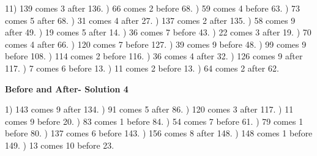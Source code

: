 \documentclass{article}%
\begin{document}
11) 139 comes 3 after 136.%
) 66 comes 2 before 68.%
) 59 comes 4 before 63.%
) 73 comes 5 after 68.%
) 31 comes 4 after 27.%
) 137 comes 2 after 135.%
) 58 comes 9 after 49.%
) 19 comes 5 after 14.%
) 36 comes 7 before 43.%
) 22 comes 3 after 19.%
) 70 comes 4 after 66.%
) 120 comes 7 before 127.%
) 39 comes 9 before 48.%
) 99 comes 9 before 108.%
) 114 comes 2 before 116.%
) 36 comes 4 after 32.%
) 126 comes 9 after 117.%
) 7 comes 6 before 13.%
) 11 comes 2 before 13.%
) 64 comes 2 after 62.%
\newline%
\newpage%
\large%
\begin{center}%
\textbf{Before and After- Solution 4}%
\newline%
\end{center} \normalsize%
1) 143 comes 9 after 134.%
) 91 comes 5 after 86.%
) 120 comes 3 after 117.%
) 11 comes 9 before 20.%
) 83 comes 1 before 84.%
) 54 comes 7 before 61.%
) 79 comes 1 before 80.%
) 137 comes 6 before 143.%
) 156 comes 8 after 148.%
) 148 comes 1 before 149.%
) 13 comes 10 before 23.%
\newline%
\end{document}
